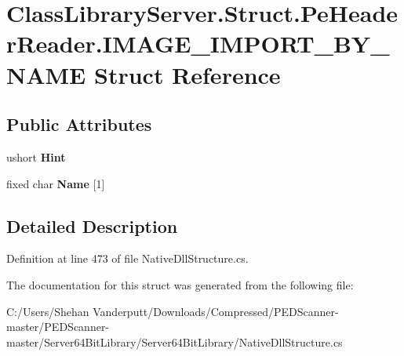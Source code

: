 \hypertarget{struct_class_library_server_1_1_struct_1_1_pe_header_reader_1_1_i_m_a_g_e___i_m_p_o_r_t___b_y___n_a_m_e}{}\section{Class\+Library\+Server.\+Struct.\+Pe\+Header\+Reader.\+I\+M\+A\+G\+E\+\_\+\+I\+M\+P\+O\+R\+T\+\_\+\+B\+Y\+\_\+\+N\+A\+ME Struct Reference}
\label{struct_class_library_server_1_1_struct_1_1_pe_header_reader_1_1_i_m_a_g_e___i_m_p_o_r_t___b_y___n_a_m_e}
\subsection*{Public Attributes}
\begin{DoxyCompactItemize}
\item 
\mbox{\label{struct_class_library_server_1_1_struct_1_1_pe_header_reader_1_1_i_m_a_g_e___i_m_p_o_r_t___b_y___n_a_m_e_aa6761fe207d2f42472549809c9dc9e49}} 
ushort {\bfseries Hint}
\item 
\mbox{\label{struct_class_library_server_1_1_struct_1_1_pe_header_reader_1_1_i_m_a_g_e___i_m_p_o_r_t___b_y___n_a_m_e_a127f2ef4a13ba2c3dcd556c118d8c045}} 
fixed char {\bfseries Name} \mbox{[}1\mbox{]}
\end{DoxyCompactItemize}


\subsection{Detailed Description}


Definition at line 473 of file Native\+Dll\+Structure.\+cs.



The documentation for this struct was generated from the following file\+:\begin{DoxyCompactItemize}
\item 
C\+:/\+Users/\+Shehan Vanderputt/\+Downloads/\+Compressed/\+P\+E\+D\+Scanner-\/master/\+P\+E\+D\+Scanner-\/master/\+Server64\+Bit\+Library/\+Server64\+Bit\+Library/Native\+Dll\+Structure.\+cs\end{DoxyCompactItemize}
